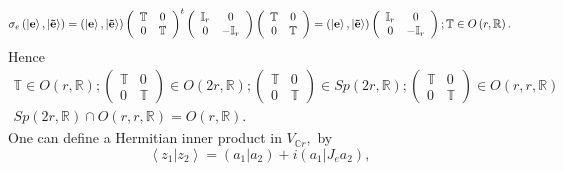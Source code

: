 \documentclass[aps,preprint]{revtex4}
\begin{document}
\begin{equation}
\sigma_{e}\left( \left\vert \mathbf{e}\right\rangle ,\left\vert \mathbf{%
\tilde{e}}\right\rangle \right) =\left( \left\vert \mathbf{e}\right\rangle
,\left\vert \mathbf{\tilde{e}}\right\rangle \right) \left( 
\begin{array}{cc}
\mathbb{T} & 0 \\ 
0 & \mathbb{T}%
\end{array}
\right) ^{t}\left( 
\begin{array}{cc}
\mathbb{I}_{r} & 0 \\ 
0 & -\mathbb{I}_{r}%
\end{array}
\right) \left( 
\begin{array}{cc}
\mathbb{T} & 0 \\ 
0 & \mathbb{T}%
\end{array}
\right) =\left( \left\vert \mathbf{e}\right\rangle ,\left\vert \mathbf{%
\tilde{e}}\right\rangle \right) \left( 
\begin{array}{cc}
\mathbb{I}_{r} & 0 \\ 
0 & -\mathbb{I}_{r}%
\end{array}
\right) ;\mathbb{T}\in O\left( r,\mathbb{R}\right) .
\end{equation}
Hence%
\begin{gather}
\mathbb{T}\in O\left( r,\mathbb{R}\right) ;\left( 
\begin{array}{cc}
\mathbb{T} & 0 \\ 
0 & \mathbb{T}%
\end{array}
\right) \in O\left( 2r,\mathbb{R}\right) ;\left( 
\begin{array}{cc}
\mathbb{T} & 0 \\ 
0 & \mathbb{T}%
\end{array}
\right) \in Sp\left( 2r,\mathbb{R}\right) ;\left( 
\begin{array}{cc}
\mathbb{T} & 0 \\ 
0 & \mathbb{T}%
\end{array}
\right) \in O\left( r,r,\mathbb{R}\right) \\
Sp\left( 2r,\mathbb{R}\right) \cap O\left( r,r,\mathbb{R}\right) =O\left( r,%
\mathbb{R}\right) .
\end{gather}
One can define a Hermitian inner product in $V_{\mathbb{C}r},$ by 
\begin{equation}
\left\langle \left. z_{1}\right\vert z_{2}\right\rangle =\left( \left.
a_{1}\right\vert a_{2}\right) +i\left( \left. a_{1}\right\vert
J_{e}a_{2}\right) ,
\end{equation}
\end{document}
